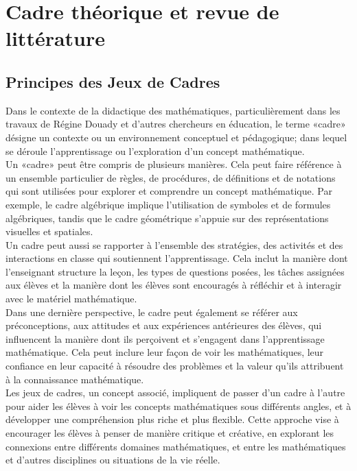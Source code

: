 \section{Cadre théorique et revue de littérature}
\subsection{Principes des Jeux de Cadres}

Dans le contexte de la didactique des mathématiques,
particulièrement dans les travaux de Régine Douady et d'autres chercheurs en éducation,
le terme «cadre» désigne un contexte ou un environnement conceptuel et pédagogique;
dans lequel se déroule l'apprentissage ou l'exploration d'un concept mathématique.\\

Un «cadre» peut être compris de plusieurs manières.
Cela peut faire référence à un ensemble particulier de règles,
de procédures,
de définitions et de notations qui sont utilisées pour explorer et comprendre un concept mathématique.
Par exemple,
le cadre algébrique implique l'utilisation de symboles et de formules algébriques,
tandis que le cadre géométrique s'appuie sur des représentations visuelles et spatiales.\\

Un cadre peut aussi se rapporter à l'ensemble des stratégies,
des activités et des interactions en classe qui soutiennent l'apprentissage.
Cela inclut la manière dont l'enseignant structure la leçon,
les types de questions posées,
les tâches assignées aux élèves et la manière dont les élèves sont encouragés à réfléchir et à interagir avec le matériel mathématique.\\

Dans une dernière perspective,
le cadre peut également se référer aux préconceptions,
aux attitudes et aux expériences antérieures des élèves,
qui influencent la manière dont ils perçoivent et s'engagent dans l'apprentissage mathématique.
Cela peut inclure leur façon de voir les mathématiques,
leur confiance en leur capacité à résoudre des problèmes et la valeur qu'ils attribuent à la connaissance mathématique.\\

Les jeux de cadres,
un concept associé,
impliquent de passer d'un cadre à l'autre pour aider les élèves à voir les concepts mathématiques sous différents angles,
et à développer une compréhension plus riche et plus flexible.
Cette approche vise à encourager les élèves à penser de manière critique et créative,
en explorant les connexions entre différents domaines mathématiques,
et entre les mathématiques et d'autres disciplines ou situations de la vie réelle.\\

